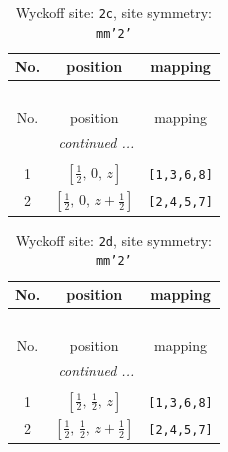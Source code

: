 \documentclass[fleqn,8pt]{jsarticle}
\begin{document}
\renewcommand{\arraystretch}{1.2}
\begin{longtable}{ccc}
\caption{Wyckoff site: {\tt 2c}, site symmetry: {\tt mm'2'}}
 \\
 \hline \hline
No. & position & mapping \\ \hline \endfirsthead

\multicolumn{2}{l}{\tablename\ \thetable{}} \\
 \hline \hline
No. & position & mapping \\ \hline \endhead

 \hline \hline
\multicolumn{2}{r}{\footnotesize\it continued ...} \\ \endfoot

 \hline \hline
\multicolumn{2}{r}{} \\ \endlastfoot

1 & $\left[ \frac{1}{2},\, 0,\, z \right]$ & {\tt [1,3,6,8]} \\ \hline
2 & $\left[ \frac{1}{2},\, 0,\, z + \frac{1}{2} \right]$ & {\tt [2,4,5,7]} \\
\end{longtable}
\renewcommand{\arraystretch}{1.2}
\begin{longtable}{ccc}
\caption{Wyckoff site: {\tt 2d}, site symmetry: {\tt mm'2'}}
 \\
 \hline \hline
No. & position & mapping \\ \hline \endfirsthead

\multicolumn{2}{l}{\tablename\ \thetable{}} \\
 \hline \hline
No. & position & mapping \\ \hline \endhead

 \hline \hline
\multicolumn{2}{r}{\footnotesize\it continued ...} \\ \endfoot

 \hline \hline
\multicolumn{2}{r}{} \\ \endlastfoot

1 & $\left[ \frac{1}{2},\, \frac{1}{2},\, z \right]$ & {\tt [1,3,6,8]} \\ \hline
2 & $\left[ \frac{1}{2},\, \frac{1}{2},\, z + \frac{1}{2} \right]$ & {\tt [2,4,5,7]} \\
\end{longtable}
\renewcommand{\arraystretch}{1.2}
\end{document}
